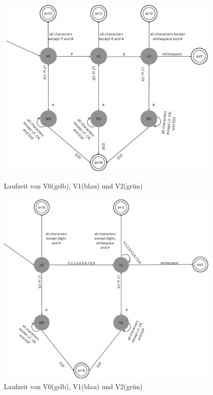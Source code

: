 \documentclass[course=erap]{aspdoc}
\begin{document}
\begin{figure}[h]
\begin{minipage}{0.55\textwidth}
\centering
\includegraphics[width=\textwidth]{Bilder/auto1.png}
\caption{Laufzeit von V0(gelb), V1(blau) und V2(grün)}
\end{minipage}
\hfill
\begin{minipage}{0.55\textwidth}
\centering
\includegraphics[width=\textwidth]{Bilder/auto2.png}
\caption{Laufzeit von V0(gelb), V1(blau) und V2(grün)}
\end{minipage}
\end{figure}
    
\end{document}
